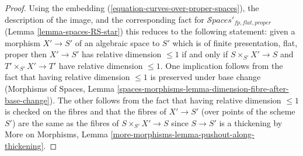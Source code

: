 \documentclass{stacks-project}
\theoremstyle{plain}
\theoremstyle{definition}
\theoremstyle{remark}
\numberwithin{equation}{subsection}
\def\Spacesstack{\mathcal{S}\!\mathit{paces}}
\begin{document}
\begin{proof}
Using the embedding (\ref{equation-curves-over-proper-spaces}),
the description of the image, and
the corresponding fact for $\Spacesstack'_{fp, flat, proper}$
(Lemma \ref{lemma-spaces-RS-star})
this reduces to the following statement:
given a morphism $X' \to S'$ of an algebraic space to $S'$
which is of finite presentation, flat, proper then
$X' \to S'$ has relative dimension $\leq 1$
if and only if $S \times_{S'} X' \to S$
and $T' \times_{S'} X' \to T'$ have relative dimension $\leq 1$.
One implication follows from the fact that
having relative dimension $\leq 1$ is preserved under base change
(Morphisms of Spaces, Lemma
\ref{spaces-morphisms-lemma-dimension-fibre-after-base-change}).
The other follows from the fact that having relative
dimension $\leq 1$ is checked on the fibres and that
the fibres of $X' \to S'$ (over points of the scheme $S'$)
are the same as the fibres of $S \times_{S'} X' \to S$
since $S \to S'$ is a thickening by
More on Morphisms, Lemma \ref{more-morphisms-lemma-pushout-along-thickening}.
\end{proof}
\end{document}
